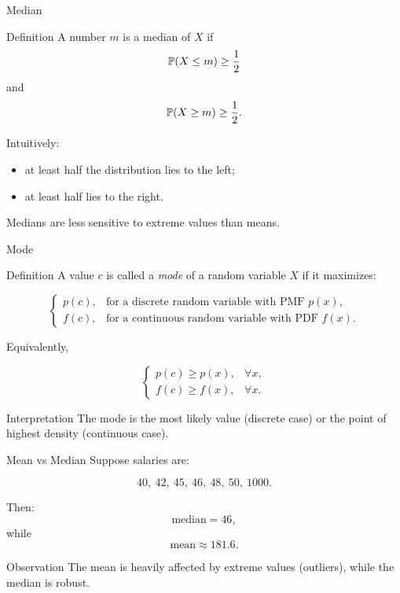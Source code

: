 \begin{frame}{Median}
\begin{keybox}{Definition}
A number $m$ is a median of $X$ if
\[
\mathbb{P}(X\leq m)\geq \frac12
\]
and
\[
\mathbb{P}(X\geq m)\geq \frac12.
\]
\end{keybox}

\vspace{0.25cm}

Intuitively:
\begin{itemize}
    \item at least half the distribution lies to the left;
    \item at least half lies to the right.
\end{itemize}

\vspace{0.25cm}

Medians are less sensitive to extreme values than means.
\end{frame}
\begin{frame}{Mode}

\begin{keybox}{Definition}
A value \(c\) is called a \emph{mode} of a random variable \(X\) if it maximizes:

\[
\begin{cases}
p(c), & \text{for a discrete random variable with PMF } p(x),\\[0.2cm]
f(c), & \text{for a continuous random variable with PDF } f(x).
\end{cases}
\]

Equivalently,

\[
\begin{cases}
p(c)\geq p(x), & \forall x,\\[0.2cm]
f(c)\geq f(x), & \forall x.
\end{cases}
\]
\end{keybox}



\begin{keybox}{Interpretation}
The mode is the most likely value (discrete case) or the point of highest density (continuous case).
\end{keybox}

\end{frame}

\begin{frame}{Mean vs Median}
Suppose salaries are:

\[
40,\ 42,\ 45,\ 46,\ 48,\ 50,\ 1000.
\]

Then:
\[
\text{median}=46,
\]
while
\[
\text{mean}\approx 181.6.
\]

\vspace{0.25cm}

\begin{keybox}{Observation}
The mean is heavily affected by extreme values (outliers), while the median is robust.
\end{keybox}
\end{frame}

